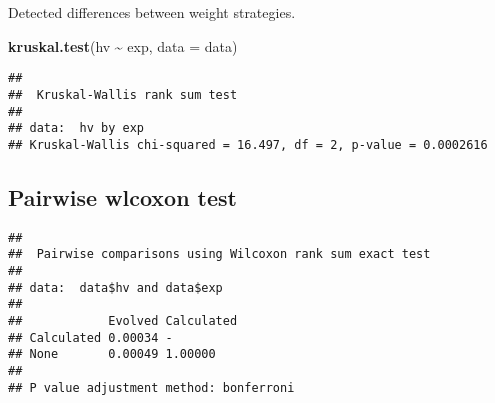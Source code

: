 \documentclass[
]{book}
\newenvironment{Shaded}{\begin{snugshade}}{\end{snugshade}}
\newcommand{\AttributeTok}[1]{\textcolor[rgb]{0.13,0.29,0.53}{#1}}
\newcommand{\ConstantTok}[1]{\textcolor[rgb]{0.56,0.35,0.01}{#1}}
\newcommand{\FunctionTok}[1]{\textcolor[rgb]{0.13,0.29,0.53}{\textbf{#1}}}
\newcommand{\NormalTok}[1]{#1}
\newcommand{\SpecialCharTok}[1]{\textcolor[rgb]{0.81,0.36,0.00}{\textbf{#1}}}
\newcommand{\StringTok}[1]{\textcolor[rgb]{0.31,0.60,0.02}{#1}}
\begin{document}
Detected differences between weight strategies.

\begin{Shaded}
\begin{Highlighting}[]
\FunctionTok{kruskal.test}\NormalTok{(hv }\SpecialCharTok{\textasciitilde{}}\NormalTok{ exp, }\AttributeTok{data =}\NormalTok{ data)}
\end{Highlighting}
\end{Shaded}

\begin{verbatim}
## 
##  Kruskal-Wallis rank sum test
## 
## data:  hv by exp
## Kruskal-Wallis chi-squared = 16.497, df = 2, p-value = 0.0002616
\end{verbatim}

\hypertarget{pairwise-wlcoxon-test-13}{%
\subsection{Pairwise wlcoxon test}\label{pairwise-wlcoxon-test-13}}

\begin{Shaded}
\end{Shaded}

\begin{verbatim}
## 
##  Pairwise comparisons using Wilcoxon rank sum exact test 
## 
## data:  data$hv and data$exp 
## 
##            Evolved Calculated
## Calculated 0.00034 -         
## None       0.00049 1.00000   
## 
## P value adjustment method: bonferroni
\end{verbatim}

  
\end{document}
